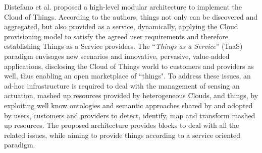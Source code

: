 Distefano \cite{distefano2012enabling} et al. proposed a high-level modular architecture to implement the
Cloud of Things. According to the authors, things not only can be discovered and aggregated, but also
provided as a service, dynamically, applying the Cloud provisioning model to satisfy the agreed
user requirements and therefore establishing Things as a Service providers. The ``\textit{Things as a Service}'' (TaaS)
paradigm envisages new scenarios and innovative, pervasive, value-added applications,
disclosing the Cloud of Things world to customers and providers as well, thus enabling an open
marketplace of ``things". To address these issues, an ad-hoc infrastructure is required to deal
with the management of sensing an actuation, mashed up resources provided by heterogeneous Clouds,
and things, by exploiting well know ontologies and semantic approaches shared by and adopted by users,
customers and providers to detect, identify, map and transform mashed up resources.
The proposed architecture provides blocks to deal with all the related issues, while aiming
to provide things according to a service oriented paradigm.\\


